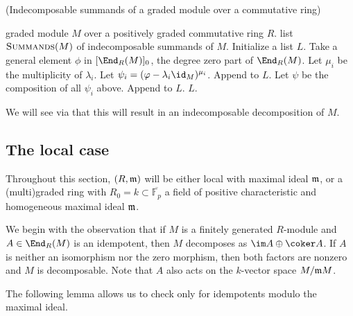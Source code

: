 \documentclass[12pt]{article}
\def\FF{\mathbb F}
\theoremstyle{theorem}
\numberwithin{thm}{section}
\theoremstyle{definition}
\begin{document}
\begin{algorithm}[H]
  \caption{(Indecomposable summands of a graded module over a commutative ring)}\label{alg:graded}
  \begin{algorithmic}[1]
    \smallskip
    \Require graded module $M$ over a positively graded commutative ring $R$.
    \Ensure  list $\textproc{Summands}(M)$ of indecomposable summands of $M$.
    \State Initialize a list $L$.
    \State Take a general element $\phi$ in $[\End_R(M)]_0$,
           the degree zero part of $\End_R(M)$. \label{item:End0}
      \State Let $\mu_i$ be the multiplicity of $\lambda_i$.
      \State Let $\psi_i = (\phi - \lambda_i \id_M)^{\mu_i}$.
      \State Append  to $L$.
    \EndFor
    \State Let $\psi$ be the composition of all $\psi_i$ above.
      \State Append  to $L$.
    \EndIf
    \State \Return $L$.
  \end{algorithmic}
\end{algorithm}

We will see via  that this will result in an indecomposable decomposition of $M$.

\subsection{The local case}\label{sec:local-alg}

Throughout this section, $(R,\mathfrak m)$ will be either local with maximal ideal $\mathfrak m$, or a (multi)graded ring with $R_0 = k \subset \overline{\FF_p}$ a field of positive characteristic and homogeneous maximal ideal $\mathfrak m$.

We begin with the observation that if $M$ is a finitely generated $R$-module and $A\in\End_R(M)$ is an idempotent, then $M$ decomposes as $\im A \oplus \coker A$. If $A$ is neither an isomorphism nor the zero morphism, then both factors are nonzero and $M$ is decomposable. Note that $A$ also acts on the $k$-vector space $M/\mathfrak m M$.

The following lemma allows us to check only for idempotents modulo the maximal ideal.
\end{document}
